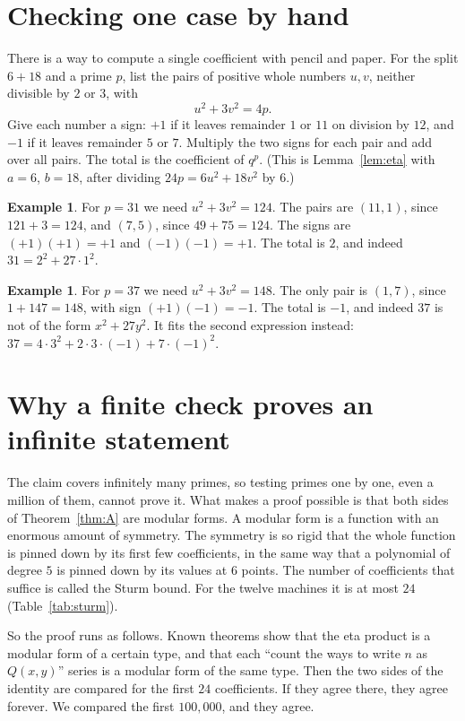 \documentclass[11pt]{amsart}
\theoremstyle{definition}
\newtheorem{example}[lemma]{Example}
\theoremstyle{remark}
\begin{document}
\section{Checking one case by hand}

There is a way to compute a single coefficient with pencil and paper. For the split $6+18$ and a prime $p$, list the pairs of positive whole numbers $u,v$, neither divisible by $2$ or $3$, with
\[
u^2+3v^2=4p .
\]
Give each number a sign: $+1$ if it leaves remainder $1$ or $11$ on division by $12$, and $-1$ if it leaves remainder $5$ or $7$. Multiply the two signs for each pair and add over all pairs. The total is the coefficient of $q^p$. (This is Lemma~\ref{lem:eta} with $a=6$, $b=18$, after dividing $24p=6u^2+18v^2$ by $6$.)

\begin{example}
For $p=31$ we need $u^2+3v^2=124$. The pairs are $(11,1)$, since $121+3=124$, and $(7,5)$, since $49+75=124$. The signs are $(+1)(+1)=+1$ and $(-1)(-1)=+1$. The total is $2$, and indeed $31=2^2+27\cdot1^2$.
\end{example}

\begin{example}
For $p=37$ we need $u^2+3v^2=148$. The only pair is $(1,7)$, since $1+147=148$, with sign $(+1)(-1)=-1$. The total is $-1$, and indeed $37$ is not of the form $x^2+27y^2$. It fits the second expression instead: $37=4\cdot3^2+2\cdot3\cdot(-1)+7\cdot(-1)^2$.
\end{example}

\section{Why a finite check proves an infinite statement}

The claim covers infinitely many primes, so testing primes one by one, even a million of them, cannot prove it. What makes a proof possible is that both sides of Theorem~\ref{thm:A} are modular forms. A modular form is a function with an enormous amount of symmetry. The symmetry is so rigid that the whole function is pinned down by its first few coefficients, in the same way that a polynomial of degree $5$ is pinned down by its values at $6$ points. The number of coefficients that suffice is called the Sturm bound. For the twelve machines it is at most $24$ (Table~\ref{tab:sturm}).

So the proof runs as follows. Known theorems show that the eta product is a modular form of a certain type, and that each ``count the ways to write $n$ as $Q(x,y)$'' series is a modular form of the same type. Then the two sides of the identity are compared for the first $24$ coefficients. If they agree there, they agree forever. We compared the first $100{,}000$, and they agree.
\end{document}
